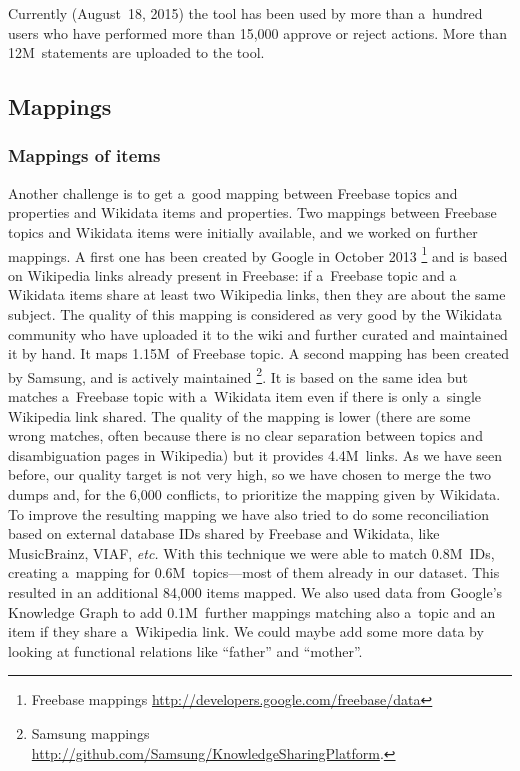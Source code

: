 \documentclass{sig-alternate}
\begin{document}
Currently (August~18, 2015) the tool has been used by more than a~hundred users
who have performed more than 15,000 approve or reject actions.
More than 12M~statements are uploaded to the tool.

\subsection{Mappings}

\subsubsection{Mappings of items}

Another challenge is to get a~good mapping between Freebase topics and properties
and Wikidata items and properties.
Two mappings between Freebase topics and Wikidata items were initially available,
and we worked on further mappings.
A first one has been created by Google in October 2013%
\footnote{Freebase mappings \url{http://developers.google.com/freebase/data}}
and is based on Wikipedia links already present in Freebase: if a~Freebase topic and
a Wikidata items share at least two Wikipedia links, then they are about the same subject.
The quality of this mapping is considered as very good by the Wikidata community
who have uploaded it to the wiki and further curated and maintained it by hand.
It maps 1.15M~of Freebase topic.
A second mapping has been created by Samsung, and is actively maintained%
\footnote{Samsung mappings \url{http://github.com/Samsung/KnowledgeSharingPlatform}.}.
It is based on the same idea but matches a~Freebase topic with a~Wikidata item
even if there is only a~single Wikipedia link shared.
The quality of the mapping is lower (there are some wrong matches,
often because there is no clear separation between topics and disambiguation pages in Wikipedia)
but it provides 4.4M~links.
As we have seen before, our quality target is not very high,
so we have chosen to merge the two dumps and, for the 6,000 conflicts,
to prioritize the mapping given by Wikidata.
To improve the resulting mapping we have also tried to do some reconciliation
based on external database IDs shared by Freebase and Wikidata, like MusicBrainz, VIAF, \emph{etc.}
With this technique we were able to match 0.8M~IDs,
creating a~mapping for 0.6M~topics---most of them already in our dataset.
This resulted in an additional 84,000 items mapped.
We also used data from Google's Knowledge Graph to add 0.1M~further mappings
matching also a~topic and an item if they share a~Wikipedia link.
We could maybe add some more data by looking at functional relations like ``father'' and ``mother''.
\end{document}
